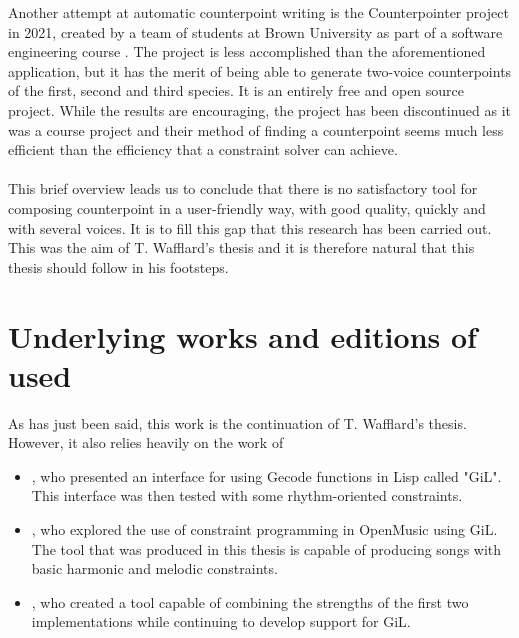 Another attempt at automatic counterpoint writing is the Counterpointer project in 2021, created by a team of students at Brown University as part of a software engineering course \cite{counterpointer_project}. The project is less accomplished than the aforementioned application, but it has the merit of being able to generate two-voice counterpoints of the first, second and third species. It is an entirely free and open source project. While the results are encouraging, the project has been discontinued as it was a course project and their method of finding a counterpoint seems much less efficient than the efficiency that a constraint solver can achieve. 


\paragraph{}
This brief overview leads us to conclude that there is no satisfactory tool for composing counterpoint in a user-friendly way, with good quality, quickly and with several voices. It is to fill this gap that this research has been carried out. This was the aim of T. Wafflard's thesis and it is therefore natural that this thesis should follow in his footsteps.



\section{Underlying works and editions of \gaps used}
As has just been said, this work is the continuation of T. Wafflard's thesis. However, it also relies heavily on the work of
\begin{itemize}
    \item \textcite{GiLthesis}, who presented an interface for using Gecode functions in Lisp called "GiL". This interface was then tested with some rhythm-oriented constraints.
    \item \textcite{Melothesis}, who explored the use of constraint programming in OpenMusic using GiL. The tool that was produced in this thesis is capable of producing songs with basic harmonic and melodic constraints.
    \item \textcite{Melo2thesis}, who created a tool capable of combining the strengths of the first two implementations while continuing to develop support for GiL.
\end{itemize}

